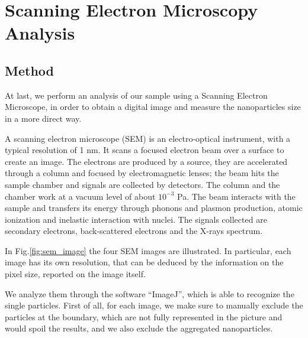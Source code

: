 \documentclass[prb,twocolumn]{revtex4-1}
\begin{document}
\section{Scanning Electron Microscopy Analysis}

\subsection{Method}

At last, we perform an analysis of our sample using a Scanning Electron Microscope, in order to obtain a digital image and measure the nanoparticles size in a more direct way.

A scanning electron microscope (SEM) is an electro-optical instrument, with a typical resolution of 1 nm. It scans a focused electron beam over a surface to create an image. The electrons are produced by a source, they are accelerated through a column and focused by electromagnetic lenses; the beam hits the sample chamber and signals are collected by detectors. The column and the chamber work at a vacuum level of about $10^{-3}$ Pa.
The beam interacts with the sample and transfers its energy through phonons and plasmon production, atomic ionization and inelastic interaction with nuclei. The signals collected are secondary electrons, back-scattered electrons and the X-rays spectrum.

In Fig.\ref{fig:sem_image} the four SEM images are illustrated. 
In particular, each image has its own resolution, that can be deduced by the information on the pixel size, reported on the image itself.

We analyze them through the software “ImageJ”, which is able to recognize the single particles. First of all, for each image, we make sure to manually exclude the particles at the boundary, which are not fully represented in the picture and would spoil the results, and we also exclude the aggregated nanoparticles. 
\end{document}
